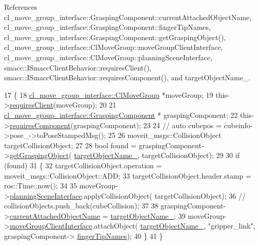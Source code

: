 References cl\+\_\+move\+\_\+group\+\_\+interface\+::\+Grasping\+Component\+::current\+Attached\+Object\+Name, cl\+\_\+move\+\_\+group\+\_\+interface\+::\+Grasping\+Component\+::finger\+Tip\+Names, cl\+\_\+move\+\_\+group\+\_\+interface\+::\+Grasping\+Component\+::get\+Grasping\+Object(), cl\+\_\+move\+\_\+group\+\_\+interface\+::\+Cl\+Move\+Group\+::move\+Group\+Client\+Interface, cl\+\_\+move\+\_\+group\+\_\+interface\+::\+Cl\+Move\+Group\+::planning\+Scene\+Interface, smacc\+::\+I\+Smacc\+Client\+Behavior\+::requires\+Client(), smacc\+::\+I\+Smacc\+Client\+Behavior\+::requires\+Component(), and target\+Object\+Name\+\_\+.


\begin{DoxyCode}
17     \{
18         \hyperlink{classcl__move__group__interface_1_1ClMoveGroup}{cl\_move\_group\_interface::ClMoveGroup} *moveGroup;
19         this->\hyperlink{classsmacc_1_1ISmaccClientBehavior_a32b16e99e3b4cb289414203dc861a440}{requiresClient}(moveGroup);
20 
21         \hyperlink{classcl__move__group__interface_1_1GraspingComponent}{cl\_move\_group\_interface::GraspingComponent} *
      graspingComponent;
22         this->\hyperlink{classsmacc_1_1ISmaccClientBehavior_a19c6d658c8e809bb93bfdc9b639a3ac3}{requiresComponent}(graspingComponent);
23 
24         \textcolor{comment}{// auto cubepos = cubeinfo->pose\_->toPoseStampedMsg();}
25 
26         moveit\_msgs::CollisionObject targetCollisionObject;
27 
28         \textcolor{keywordtype}{bool} found = graspingComponent->\hyperlink{classcl__move__group__interface_1_1GraspingComponent_a283b379a7b7ad91c69ee94a057730165}{getGraspingObject}(
      \hyperlink{classcl__move__group__interface_1_1CbAttachObject_a58dcc567e6316e57eb36e6d5a38f7287}{targetObjectName\_}, targetCollisionObject);
29 
30         \textcolor{keywordflow}{if} (found)
31         \{
32             targetCollisionObject.operation = moveit\_msgs::CollisionObject::ADD;
33             targetCollisionObject.header.stamp = ros::Time::now();
34 
35             moveGroup->\hyperlink{classcl__move__group__interface_1_1ClMoveGroup_a11bfab580f36e2ad32c9b37d6f58f44c}{planningSceneInterface}.applyCollisionObject(
      targetCollisionObject);
36             \textcolor{comment}{// collisionObjects.push\_back(cubeCollision);}
37 
38             graspingComponent->\hyperlink{classcl__move__group__interface_1_1GraspingComponent_a486b5c831dc81ae0bf909b585ba7c615}{currentAttachedObjectName} = 
      \hyperlink{classcl__move__group__interface_1_1CbAttachObject_a58dcc567e6316e57eb36e6d5a38f7287}{targetObjectName\_};
39             moveGroup->\hyperlink{classcl__move__group__interface_1_1ClMoveGroup_a92922ea689e4e1b7b91512c56629c95b}{moveGroupClientInterface}.attachObject(
      \hyperlink{classcl__move__group__interface_1_1CbAttachObject_a58dcc567e6316e57eb36e6d5a38f7287}{targetObjectName\_}, \textcolor{stringliteral}{"gripper\_link"}, graspingComponent->
      \hyperlink{classcl__move__group__interface_1_1GraspingComponent_afc08a0abc3220a377d0bbf798383a42a}{fingerTipNames});
40         \}
41     \}
\end{DoxyCode}

